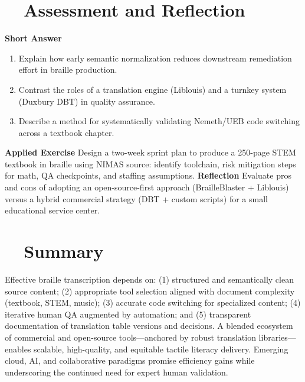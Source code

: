 \section{~~Assessment and Reflection}
\label{sec:braille-assessment}
\textbf{Short Answer}
\begin{enumerate}
	\item Explain how early semantic normalization reduces downstream remediation effort in braille production.
	\item Contrast the roles of a translation engine (Liblouis) and a turnkey system (Duxbury DBT) in quality assurance.
	\item Describe a method for systematically validating Nemeth/UEB code switching across a textbook chapter.
\end{enumerate}
\textbf{Applied Exercise} Design a two-week sprint plan to produce a 250-page STEM textbook in braille using NIMAS source: identify toolchain, risk mitigation steps for math, QA checkpoints, and staffing assumptions.
\textbf{Reflection} Evaluate pros and cons of adopting an open-source-first approach (BrailleBlaster + Liblouis) versus a hybrid commercial strategy (DBT + custom scripts) for a small educational service center.

\section{~~Summary}
\label{sec:braille-summary}
Effective braille transcription depends on: (1) structured and semantically clean source content; (2) appropriate tool selection aligned with document complexity (textbook, STEM, music); (3) accurate code switching for specialized content; (4) iterative human QA augmented by automation; and (5) transparent documentation of translation table versions and decisions. A blended ecosystem of commercial and open-source tools—anchored by robust translation libraries—enables scalable, high-quality, and equitable tactile literacy delivery. Emerging cloud, AI, and collaborative paradigms promise efficiency gains while underscoring the continued need for expert human validation.

